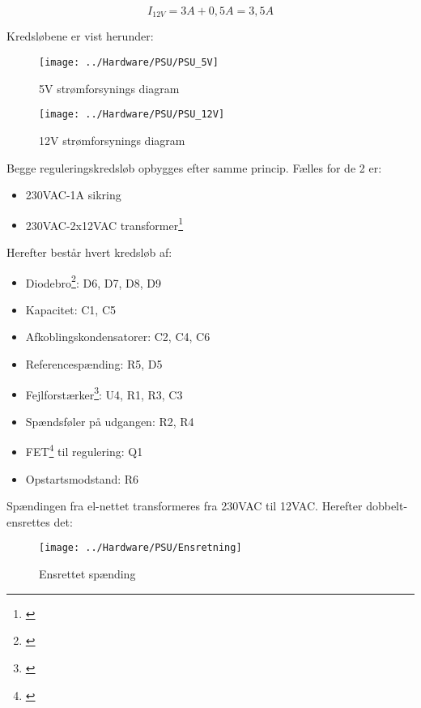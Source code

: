 \begin{equation}
	I_{12V} = 3A + 0,5A = 3,5A
\end{equation}

Kredsløbene er vist herunder:
\begin{figure}[H]
	\centering
	\texttt{[image: ../Hardware/PSU/PSU\_5V]}
	\caption{5V strømforsynings diagram}
	\label{photo:PSU_5V}
\end{figure}

\begin{figure}[H]
	\centering
	\texttt{[image: ../Hardware/PSU/PSU\_12V]}
	\caption{12V strømforsynings diagram}
	\label{photo:PSU_12V}
\end{figure}

Begge reguleringskredsløb opbygges efter samme princip. Fælles for de 2 er:
\begin{itemize}
\item 230VAC-1A sikring
\item 230VAC-2x12VAC transformer\footnote{\citet{ns:0160P12012}}
\end{itemize}

Herefter består hvert kredsløb af:
\begin{itemize}
\item Diodebro\footnote{\citet{ir:36MB120A}}: D6, D7, D8, D9
\item Kapacitet: C1, C5
\item Afkoblingskondensatorer: C2, C4, C6
\item Referencespænding: R5, D5
\item Fejlforstærker\footnote{\citet{ns:LF356N}}: U4, R1, R3, C3
\item Spændsføler på udgangen: R2, R4
\item FET\footnote{\citet{vishay:IRF9Z24}} til regulering: Q1
\item Opstartsmodstand: R6
\end{itemize}

Spændingen fra el-nettet transformeres fra 230VAC til 12VAC. Herefter dobbelt-ensrettes det:

\begin{figure}[H]
	\centering
	\texttt{[image: ../Hardware/PSU/Ensretning]}
	\caption{Ensrettet spænding}
	\label{photo:Ensrettet}
\end{figure}

